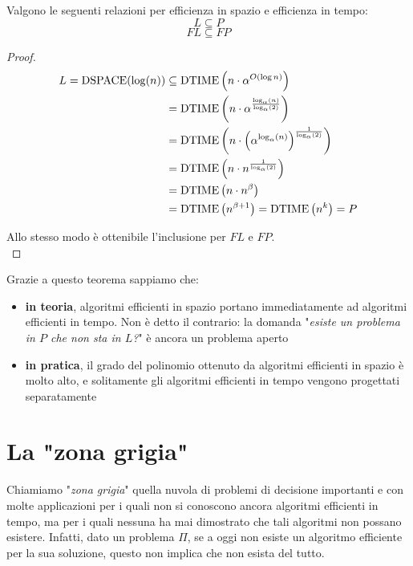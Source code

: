 \begin{theor}
	Valgono le seguenti relazioni per efficienza in spazio e efficienza in tempo:
	$$ L \subseteq P $$
	$$ FL \subseteq FP $$
\end{theor}
\begin{proof}
	\begin{align*}
		L = \text{DSPACE} (\log (n)) & \subseteq \text{DTIME} \left(n \cdot \alpha^{O(\log n)}\right) \\
		& = \text{DTIME} \left(n \cdot \alpha^{\frac{\log_\alpha (n)}{\log_\alpha (2)}}\right) \\
		& = \text{DTIME} \left(n \cdot \left(\alpha^{\log_\alpha (n)}\right)^{\frac{1}{\log_\alpha (2)}}\right) \\
		& = \text{DTIME} \left(n \cdot n^{\frac{1}{\log_\alpha (2)}}\right) \\
		& = \text{DTIME} \left(n \cdot n^\beta \right) \\
		& = \text{DTIME} \left(n^{\beta + 1}\right) = \text{DTIME}\left(n^k\right) = P
	\end{align*}
	
	Allo stesso modo è ottenibile l'inclusione per $FL$ e $FP$.\\
\end{proof}

Grazie a questo teorema sappiamo che:
\begin{itemize}
	\item \textbf{in teoria}, algoritmi efficienti in spazio portano immediatamente ad algoritmi efficienti in tempo. Non è detto il contrario: la domanda "\textit{esiste un problema in $P$ che non sta in $L$?}" è ancora un problema aperto
	\item \textbf{in pratica}, il grado del polinomio ottenuto da algoritmi efficienti in spazio è molto alto, e solitamente gli algoritmi efficienti in tempo vengono progettati separatamente
\end{itemize}

\section{La "zona grigia"}

Chiamiamo "\textit{zona grigia}" quella nuvola di problemi di decisione importanti e con molte applicazioni per i quali non si conoscono ancora algoritmi efficienti in tempo, ma per i quali nessuna ha mai dimostrato che tali algoritmi non possano esistere. Infatti, dato un problema $\Pi$, se a oggi non esiste un algoritmo efficiente per la sua soluzione, questo non implica che non esista del tutto.\\

